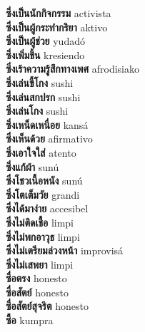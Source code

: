 \textbf{ ซึ่งเป็นนักกิจกรรม  } activista \\
\textbf{ ซึ่งเป็นผู้กระทำกริยา  } aktivo \\
\textbf{ ซึ่งเป็นผู้ช่วย  } yudadó \\
\textbf{ ซึ่งเพิ่มขึ้น  } kresiendo \\
\textbf{ ซึ่งเร้าความรู้สึกทางเพศ  } afrodisiako \\
\textbf{ ซึ่งเล่นขี้โกง  } sushi \\
\textbf{ ซึ่งเล่นสกปรก  } sushi \\
\textbf{ ซึ่งเล่นโกง  } sushi \\
\textbf{ ซึ่งเหน็ดเหนื่อย  } kansá \\
\textbf{ ซึ่งเห็นด้วย  } afirmativo \\
\textbf{ ซึ่งเอาใจใส่  } atento \\
\textbf{ ซึ่งแก้ผ้า  } sunú \\
\textbf{ ซึ่งโชวเนื้อหนัง  } sunú \\
\textbf{ ซึ่งโตเต็มวัย  } grandi \\
\textbf{ ซึ่งได้มาง่าย  } accesibel \\
\textbf{ ซึ่งไม่ติดเชื้อ  } limpi \\
\textbf{ ซึ่งไม่พกอาวุธ  } limpi \\
\textbf{ ซึ่งไม่เตรียมล่วงหน้า  } improvisá \\
\textbf{ ซึ่งไม่เสพยา  } limpi \\
\textbf{ ซื่อตรง  } honesto \\
\textbf{ ซื่อสัตย์  } honesto \\
\textbf{ ซื่อสัตย์สุจริต  } honesto \\
\textbf{ ซื้อ  } kumpra \\
